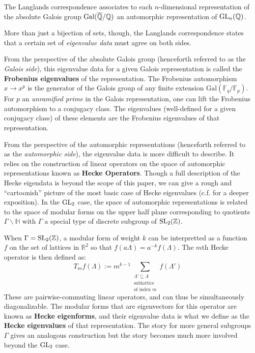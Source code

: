 \begin{idea}
	The Langlands correspondence associates to each $n$-dimensional representation of the absolute Galois group $\mathrm{Gal}(\overline {\mathbb{Q}}/\mathbb{Q})$ an automorphic representation of $\mathrm{GL}_n(\mathbb{Q})$.
\end{idea}
More than just a bijection of sets, though, the Langlands correspondence states that a certain set of \emph{eigenvalue data} must agree on both sides. 

From the perspective of the absolute Galois group (henceforth referred to as the \emph{Galois side}), this eigenvalue data for a given Galois representation is called the \textbf{Frobenius eigenvalues} of the representation. The Frobenius automorphism $x \to x^p$ is the generator of the Galois group of any finite extension $\mathrm{Gal}(\mathbb F_q/\mathbb F_p)$. For $p$ an \emph{unramified prime} in the Galois representation, one can lift the Frobenius automorphism to a conjugacy class. The eigenvalues (well-defined for a given conjugacy class) of these elements are the Frobenius eigenvalues of that representation. 

From the perspective of the automorphic representations (henceforth referred to as the \emph{automorphic side}), the eigenvalue data is more difficult to describe. It relies on the construction of linear operators on the space of automorphic representations known as \textbf{Hecke Operators}. Though a full description of the Hecke eigendata is beyond the scope of this paper, we can give a rough and ``cartoonish'' picture of the most basic case of Hecke eigenvalues (c.f. \cite{miyake1971, kudla2004} for a deeper exposition). In the $\mathrm{GL}_2$ case, the space of automorphic representations is related to the space of modular forms on the upper half plane corresponding to quotients $\Gamma \backslash \mathbb H$ with $\Gamma$ a special type of discrete subgroup of $\mathrm{SL}_2(\mathbb Z)$. 

When $\Gamma = \mathrm{SL}_2(\mathbb Z)$, a modular form of weight $k$ can be interpretted as a function $f$ on the set of lattices in $\mathbb R^2$ so that $f(a\Lambda) = a^{-k} f(\Lambda)$.
The $m$th Hecke operator is then defined as:
\[
	T_m f (\Lambda) := m^{k-1} \sum_{\substack{\Lambda' \subseteq \Lambda \\\text{sublattice}\\\text{of index }m}} f(\Lambda')
\]
These are pairwise-commuting linear operators, and can thus be simultaneously diagonalizable. 
The modular forms that are eigenvectors for this operator are known as \textbf{Hecke eigenforms}, and their eigenvalue data is what we define as the \textbf{Hecke eigenvalues} of that representation. The story for more general subgroups $\Gamma$ gives an analogous construction but the story becomes much more involved beyond the $\mathrm{GL}_2$ case.


